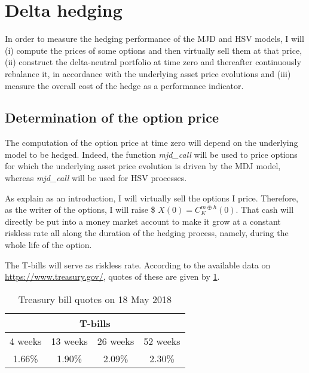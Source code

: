 \documentclass[12pt]{report}
\begin{document}
\section{Delta hedging}
\label{sec:methodology:delta}

In order to measure the hedging performance of the MJD and HSV models, I will (i) compute the prices of some options and then virtually sell them at that price, (ii)  construct the delta-neutral portfolio at time zero and thereafter continuously rebalance it, in accordance with the underlying asset price evolutions and (iii) measure the overall cost of the hedge as a performance indicator.




\subsection{Determination of the option price}
\label{sec:methodology:determination}

The computation of the option price at time zero will depend on the underlying model to be hedged.
Indeed, the function \textit{mjd\_call} will be used to price options for which the underlying asset price evolution is driven by the MDJ model, whereas \textit{mjd\_call} will be used for HSV processes.

As explain as an introduction, I will virtually sell the options I price.
Therefore, as the writer of the options, I will raise \$ $X(0) = C_K^{m \oplus h} (0)$.
That cash will directly be put into a money market account to make it grow at a constant riskless rate all along the duration of the hedging process, namely, during the whole life of the option.

The T-bills will serve as riskless rate. According to the available data on \url{https://www.treasury.gov/}, quotes of these are given by \cref{tab:methodology:Tbill}.

\begin{table}[ht]
\centering
\begin{tabular}{cccc}
  \hline
  \multicolumn{4}{c}{T-bills} \\
  \hline
  4 weeks & 13 weeks & 26 weeks & 52 weeks \\
  1.66\% & 1.90\% & 2.09\% & 2.30\% \\
  \hline
\end{tabular}
\caption{Treasury bill quotes on 18 May 2018} 
\label{tab:methodology:Tbill}
\end{table}
\end{document}

